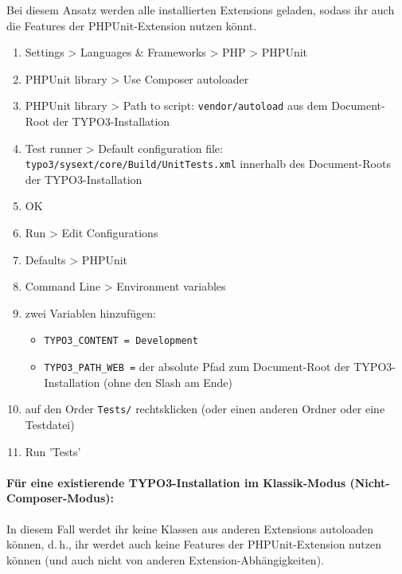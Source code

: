 \documentclass[a4paper,11pt,headsepline]{scrartcl}
\begin{document}
Bei diesem Ansatz werden alle installierten Extensions geladen, sodass ihr auch die Features der PHPUnit-Extension nutzen könnt.

\begin{enumerate}
  \item Settings > Languages \& Frameworks > PHP > PHPUnit
  \item PHPUnit library > Use Composer autoloader
  \item PHPUnit library > Path to script: \texttt{vendor/autoload} aus dem Document-Root der TYPO3-Installation
  \item Test runner > Default configuration file: \texttt{typo3/sysext/core/Build/UnitTests.xml} innerhalb des Document-Roots der TYPO3-Installation
  \item OK
  \item Run > Edit Configurations
  \item Defaults > PHPUnit
  \item Command Line > Environment variables
  \item zwei Variablen hinzufügen:
    \begin{itemize}
      \item \texttt{TYPO3\_CONTENT = Development}
      \item \texttt{TYPO3\_PATH\_WEB =} der absolute Pfad zum Document-Root der TYPO3-Installation (ohne den Slash am Ende)
    \end{itemize}
  \item auf den Order \texttt{Tests/} rechtsklicken (oder einen anderen Ordner oder eine Testdatei)
  \item Run 'Tests'
\end{enumerate}


\paragraph{Für eine existierende TYPO3-Installation im Klassik-Modus (Nicht-Composer-Modus):}

In diesem Fall werdet ihr keine Klassen aus anderen Extensions autoloaden können, d.\,h., ihr werdet auch keine Features der PHPUnit-Extension nutzen können (und auch nicht von anderen Extension-Abhängigkeiten).
\end{document}
